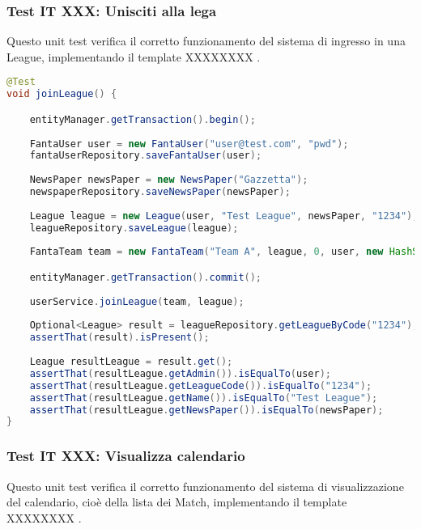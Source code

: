 \subsubsection{Test IT XXX: Unisciti alla lega}

Questo unit test verifica il corretto funzionamento del sistema di ingresso in una League,
implementando il template XXXXXXXX .

\begin{lstlisting}[language=Java]
@Test
void joinLeague() {

	entityManager.getTransaction().begin();
	
	FantaUser user = new FantaUser("user@test.com", "pwd");
	fantaUserRepository.saveFantaUser(user);
		
	NewsPaper newsPaper = new NewsPaper("Gazzetta");
	newspaperRepository.saveNewsPaper(newsPaper);
		
	League league = new League(user, "Test League", newsPaper, "1234");
	leagueRepository.saveLeague(league);
		
	FantaTeam team = new FantaTeam("Team A", league, 0, user, new HashSet<Contract>());

	entityManager.getTransaction().commit();
		
	userService.joinLeague(team, league);
		
	Optional<League> result = leagueRepository.getLeagueByCode("1234");
	assertThat(result).isPresent();
		
	League resultLeague = result.get();
	assertThat(resultLeague.getAdmin()).isEqualTo(user);
	assertThat(resultLeague.getLeagueCode()).isEqualTo("1234");
	assertThat(resultLeague.getName()).isEqualTo("Test League");
	assertThat(resultLeague.getNewsPaper()).isEqualTo(newsPaper);
}
\end{lstlisting}


\subsubsection{Test IT XXX: Visualizza calendario}

Questo unit test verifica il corretto funzionamento del sistema di visualizzazione del calendario, cioè della lista dei Match,
implementando il template XXXXXXXX .

